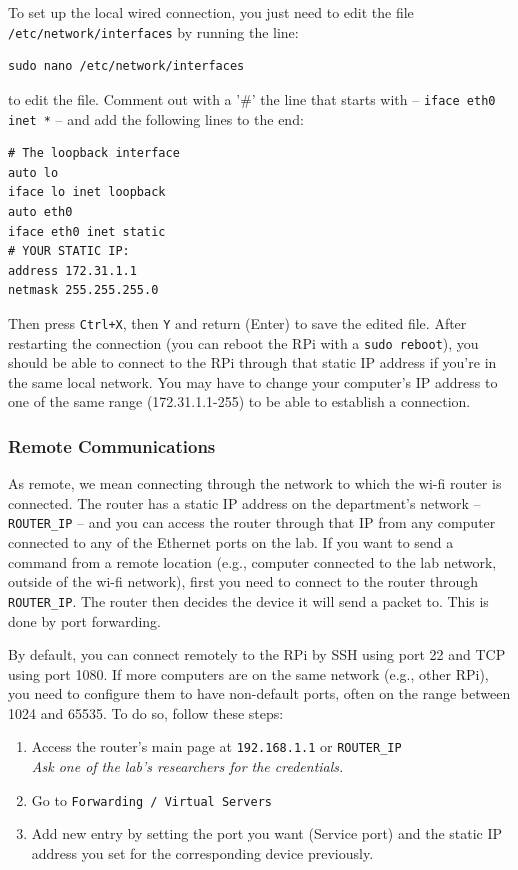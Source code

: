 \documentclass[twoside,a4paper]{refart}
\begin{document}
To set up the local wired connection, you just need to edit the file {\tt /etc/network/interfaces} by running the line:
\begin{verbatim}sudo nano /etc/network/interfaces \end{verbatim}
to edit the file. Comment out with a '\#' the line that starts with -- {\tt iface eth0 inet *} -- and add the following lines to the end:
\begin{verbatim}
# The loopback interface
auto lo
iface lo inet loopback
auto eth0
iface eth0 inet static
# YOUR STATIC IP:
address 172.31.1.1
netmask 255.255.255.0
\end{verbatim}
Then press {\tt Ctrl+X}, then {\tt Y} and return (Enter) to save the edited file. After restarting the connection (you can reboot the RPi with a {\tt sudo reboot}), you should be able to connect to the RPi through that static IP address if you're in the same local network. You may have to change your computer's IP address to one of the same range (172.31.1.1-255) to be able to establish a connection.

\subsubsection{Remote Communications}
As remote, we mean connecting through the network to which the wi-fi router is connected. The router has a static IP address on the department's network -- {\tt ROUTER\_IP} -- and you can access the router through that IP from any computer connected to any of the Ethernet ports on the lab.
If you want to send a command from a remote location (e.g., computer connected to the lab network, outside of the wi-fi network), first you need to connect to the router through {\tt ROUTER\_IP}. The router then decides the device it will send a packet to. This is done by port forwarding. 

By default, you can connect remotely to the RPi by SSH using port 22 and TCP using port 1080. If more computers are on the same network (e.g., other RPi), you need to configure them to have non-default ports,  often on the range between 1024 and 65535. To do so, follow these steps:
\begin{enumerate}
	\item
	Access the router's main page at {\tt 192.168.1.1} or {\tt ROUTER\_IP}  \\
	\emph{Ask one of the lab's researchers for the credentials.}
	\item
	Go to {\tt Forwarding / Virtual Servers}
	\item
	Add new entry by setting the port you want (Service port) and the static IP address you set for the corresponding device previously.
\end{enumerate}
\end{document}
